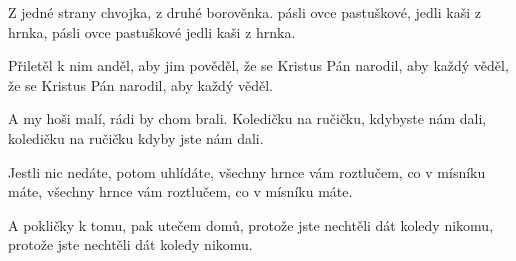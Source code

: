 \vskip-5mm
\IncludeLilypond

Z jedné strany chvojka,
z druhé borověnka.
pásli ovce pastuškové,
jedli kaši z hrnka,
pásli ovce pastuškové
jedli kaši z hrnka.

Přiletěl k nim anděl,
aby jim pověděl,
že se Kristus Pán narodil,
aby každý věděl,
že se Kristus Pán narodil,
aby každý věděl.

A my hoši malí,
rádi by chom brali.
Koledičku na ručičku,
kdybyste nám dali,
koledičku na ručičku
kdyby jste nám dali.

Jestli nic nedáte,
potom uhlídáte,
všechny hrnce vám roztlučem,
co v mísníku máte,
všechny hrnce vám roztlučem,
co v mísníku máte.

A pokličky k tomu,
pak utečem domů,
protože jste nechtěli
dát koledy nikomu,
protože jste nechtěli
dát koledy nikomu.
